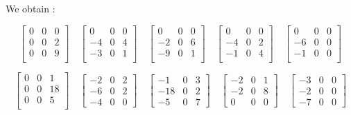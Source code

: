 \documentclass{article}
\begin{document}
	We obtain : 
	
		\[
		\begin{bmatrix}
			0 & 0 & 0 \\
			0 & 0 & 2 \\
			0 & 0 & 9 \\
		\end{bmatrix}
		\quad
		\begin{bmatrix}
			 0 & 0 & 0 \\
			-4 & 0 & 4 \\
			-3 & 0 & 1 \\
		\end{bmatrix}
		\quad
		\begin{bmatrix}
			 0 & 0 & 0 \\
			-2 & 0 & 6 \\
			-9 & 0 & 1 \\
		\end{bmatrix}
		\quad
		\begin{bmatrix}
			 0 & 0 & 0 \\
			-4 & 0 & 2 \\
			-1 & 0 & 4 \\
		\end{bmatrix}
		\quad
		\begin{bmatrix}
		 	 0 & 0 & 0 \\
			-6 & 0 & 0 \\
			-1 & 0 & 0 \\
		\end{bmatrix}
		\]
	
		\[
		\begin{bmatrix}
			0 & 0 & 1 \\
			0 & 0 & 18 \\
			0 & 0 & 5 \\
		\end{bmatrix}
		\quad
		\begin{bmatrix}
			-2 & 0 & 2 \\
			-6 & 0 & 2 \\
			-4 & 0 & 0
		\end{bmatrix}
		\quad
		\begin{bmatrix}
			 -1 & 0 & 3\\
			-18 & 0 & 2\\
		 	 -5 & 0 & 7
		\end{bmatrix}
		\quad
		\begin{bmatrix}
			-2 & 0 & 1\\
			-2 & 0 & 8\\
			 0 & 0 & 0
		\end{bmatrix}
		\quad
		\begin{bmatrix}
			-3 & 0 & 0\\
			-2 & 0 & 0\\
			-7 & 0 & 0
		\end{bmatrix}
		\]
	
\end{document}
